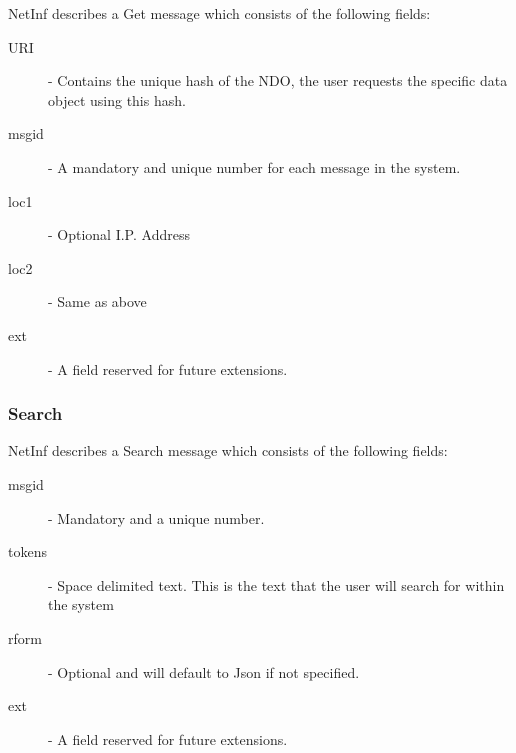 NetInf describes a Get message which consists of the following fields:

\begin{description}
\item[URI] - Contains the unique hash of the NDO, the user requests the specific data object using this hash.
\item[msgid]- A mandatory and unique number for each message in the system.
\item[loc1] - Optional I.P. Address 
\item[loc2] - Same as above
\item[ext]  - A field reserved for future extensions.
\end{description}


\subsubsection{Search}

NetInf describes a Search message which consists of the following fields:

\begin{description}
\item[msgid] - Mandatory and a unique number.
\item[tokens] - Space delimited text. This is the text that the user will search for within the system
\item[rform] - Optional and will default to Json if not specified.
\item[ext] - A field reserved for future extensions.
\end{description}

